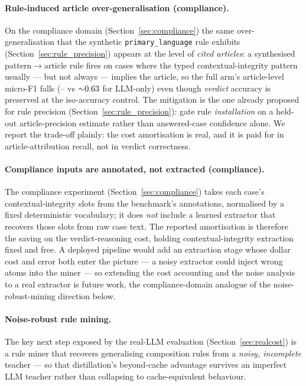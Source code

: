 \documentclass[11pt]{article}
\theoremstyle{plain}
\begin{document}
\paragraph{Rule-induced article over-generalisation (compliance).} On the
compliance domain (Section~\ref{sec:compliance}) the same over-generalisation
that the synthetic \texttt{primary\_language} rule exhibits
(Section~\ref{sec:rule_precision}) appears at the level of \emph{cited
articles}: a synthesised pattern$\to$article rule fires on cases where the typed
contextual-integrity pattern usually --- but not always --- implies the article,
so the full arm's article-level micro-F1 falls
(\privArtFOneFullGemini--\privArtFOneFullGrok{} vs
${\sim}0.63{}$ for LLM-only) even though \emph{verdict} accuracy
is preserved at the iso-accuracy control. The mitigation is the one already
proposed for rule precision (Section~\ref{sec:rule_precision}): gate rule
\emph{installation} on a held-out article-precision estimate rather than
answered-case confidence alone. We report the trade-off plainly: the cost
amortisation is real, and it is paid for in article-attribution recall, not in
verdict correctness.

\paragraph{Compliance inputs are annotated, not extracted (compliance).} The
compliance experiment (Section~\ref{sec:compliance}) takes each case's
contextual-integrity slots from the benchmark's annotations, normalised by a
fixed deterministic vocabulary; it does \emph{not} include a learned extractor
that recovers those slots from raw case text. The reported amortisation is
therefore the saving on the verdict-reasoning cost, holding contextual-integrity
extraction fixed and free. A deployed pipeline would add an extraction stage
whose dollar cost and error both enter the picture --- a noisy extractor could
inject wrong atoms into the miner --- so extending the cost accounting and the
noise analysis to a real extractor is future work, the compliance-domain
analogue of the noise-robust-mining direction below.

\paragraph{Noise-robust rule mining.} The key next step exposed by the
real-LLM evaluation (Section~\ref{sec:realcost}) is a rule miner that
recovers generalising composition rules from a \emph{noisy, incomplete}
teacher --- so that distillation's beyond-cache advantage survives an
imperfect LLM teacher rather than collapsing to cache-equivalent behaviour.
\end{document}
